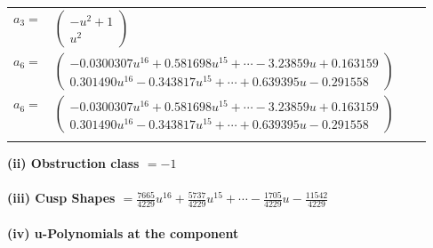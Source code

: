 \documentclass[1p]{elsarticle_modified}
\theoremstyle{definition}
\begin{document}
\begin{tabular}{m{7pt} m{180pt} m{7pt} m{180pt} }
\flushright $a_{3}=$&$\begin{pmatrix}- u^2+1\\u^2\end{pmatrix}$ \\
\flushright $a_{6}=$&$\begin{pmatrix}-0.0300307 u^{16}+0.581698 u^{15}+\cdots-3.23859 u+0.163159\\0.301490 u^{16}-0.343817 u^{15}+\cdots+0.639395 u-0.291558\end{pmatrix}$\\ \flushright $a_{6}=$&$\begin{pmatrix}-0.0300307 u^{16}+0.581698 u^{15}+\cdots-3.23859 u+0.163159\\0.301490 u^{16}-0.343817 u^{15}+\cdots+0.639395 u-0.291558\end{pmatrix}$\\&\end{tabular}
\flushleft \textbf{(ii) Obstruction class $= -1$}\\~\\
\flushleft \textbf{(iii) Cusp Shapes $= \frac{7665}{4229} u^{16}+\frac{5737}{4229} u^{15}+\cdots-\frac{1705}{4229} u-\frac{11542}{4229}$}\\~\\
\newpage\renewcommand{\arraystretch}{1}
\flushleft \textbf{(iv) u-Polynomials at the component}\newline \\
\end{document}
